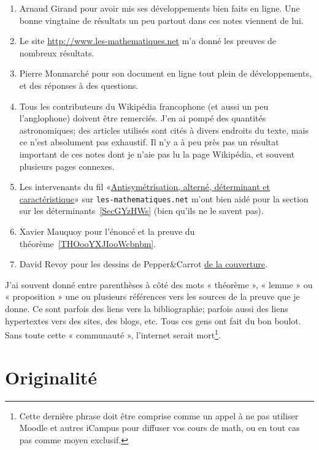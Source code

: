 \begin{enumerate}
    \item
	Arnaud Girand pour avoir mis ses développements bien faits en ligne. Une bonne vingtaine de résultats un peu partout dans ces notes viennent de lui.
    \item
	Le site \url{http://www.les-mathematiques.net} m'a donné les preuves de nombreux résultats.
    \item
	Pierre Monmarché pour son document en ligne tout plein de développements, et des réponses à des questions.
    \item
        Tous les contributeurs du Wikipédia francophone (et aussi un peu l'anglophone) doivent être remerciés. J'en ai pompé des quantités astronomiques; des articles utilisés sont cités à divers endroits du texte, mais ce n'est absolument pas exhaustif. Il n'y a à peu près pas un résultat important de ces notes dont je n'aie pas lu la page Wikipédia, et souvent plusieurs pages connexes.
    \item
        Les intervenants du fil «\href{http://www.les-mathematiques.net/phorum/read.php?2,302266}{Antisymétrisation, alterné, déterminant et caractéristique}» sur \texttt{les-mathematiques.net} m'ont bien aidé pour la section sur les déterminants~\ref{SecGYzHWs} (bien qu'ils ne le savent pas).
    \item
        Xavier Mauquoy pour l'énoncé et la preuve du théorème~\ref{THOooYXJIooWcbnbm}.
    \item
        David Revoy pour les dessins de Pepper\&Carrot \href{https://www.peppercarrot.com/fr/article285/episode-8-pepper-s-birthday-party}{de la couverture}.
\end{enumerate}

J'ai souvent donné entre parenthèses à côté des mots « théorème », « lemme » ou « proposition » une ou plusieurs références vers les sources de la preuve que je donne. Ce sont parfois des liens vers la bibliographie; parfois aussi des liens hypertextes vers des sites, des blogs, etc. Tous ces gens ont fait du bon boulot. Sans toute cette « communauté », l'internet serait mort\footnote{Cette dernière phrase doit être comprise comme un appel à ne pas utiliser Moodle et autres iCampus pour diffuser vos cours de math, ou en tout cas pas comme moyen exclusif.}.

\section{Originalité}

